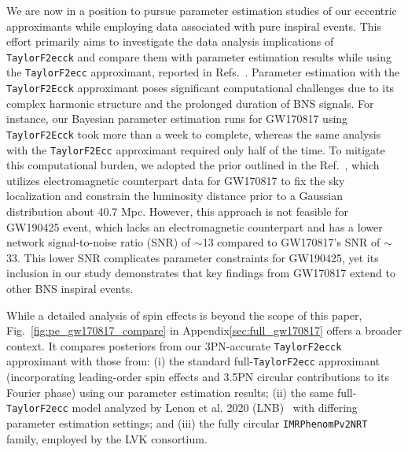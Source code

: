 \documentclass[aps,prd,twocolumn,superscriptaddress,groupedaddress,nofootinbib,showpacs,eqsecnum,useAms]{revtex4-2}
\begin{document}
We are now in a position to pursue parameter estimation studies of our eccentric approximants while employing data associated with pure inspiral events. This effort primarily aims to investigate the data analysis implications of \texttt{TaylorF2ecck} and compare them with parameter estimation results while using 
the  \texttt{TaylorF2ecc} approximant, 
reported in Refs.~\cite{LNB, Favata2022}.
Parameter estimation with the \texttt{TaylorF2Ecck} approximant poses significant computational challenges due to its complex harmonic structure and the prolonged duration of BNS signals. For instance, our Bayesian parameter estimation runs for GW170817 using \texttt{TaylorF2Ecck} took more than a week to complete, whereas the same analysis with the \texttt{TaylorF2Ecc} approximant required only half of the time. To mitigate this computational burden, we adopted the prior outlined in the Ref.~\cite{LNB}, which utilizes electromagnetic counterpart data for GW170817 to fix the sky localization and constrain the luminosity distance prior to a Gaussian distribution about 40.7 Mpc. However, this approach is not feasible for GW190425 event, which lacks an electromagnetic counterpart and has a lower network signal-to-noise ratio (SNR) of $\sim$13 compared to GW170817’s SNR of $\sim$33. This lower SNR complicates parameter constraints for GW190425, yet its inclusion in our study demonstrates that key findings from GW170817 extend to other BNS inspiral events. 

While a detailed analysis of spin effects is beyond the scope of this paper, Fig.~\ref{fig:pe_gw170817_compare} in Appendix\ref{sec:full_gw170817} offers a broader context. It compares posteriors from our 3PN-accurate \texttt{TaylorF2ecck} approximant with those from: (i) the standard full-\texttt{TaylorF2ecc} approximant (incorporating leading-order spin effects and 3.5PN circular contributions to its Fourier phase) using our parameter estimation results; (ii) the same full-\texttt{TaylorF2ecc} model analyzed by Lenon et al. 2020 (LNB)~\cite{LNB} with differing parameter estimation settings; and (iii) the fully circular \texttt{IMRPhenomPv2NRT} family, employed by the LVK consortium.
\end{document}
